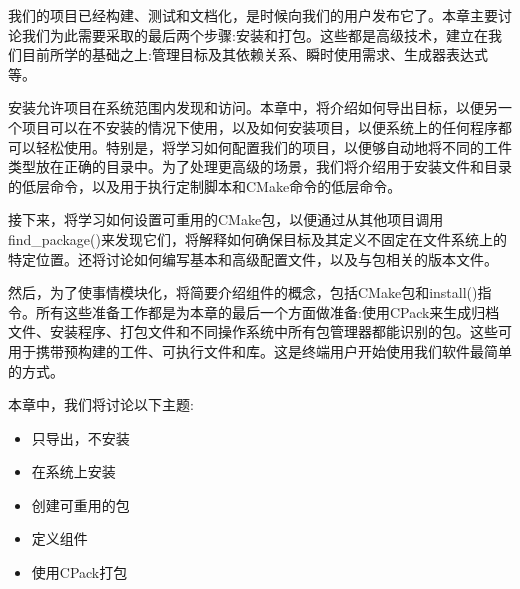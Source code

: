 
我们的项目已经构建、测试和文档化，是时候向我们的用户发布它了。本章主要讨论我们为此需要采取的最后两个步骤:安装和打包。这些都是高级技术，建立在我们目前所学的基础之上:管理目标及其依赖关系、瞬时使用需求、生成器表达式等。

安装允许项目在系统范围内发现和访问。本章中，将介绍如何导出目标，以便另一个项目可以在不安装的情况下使用，以及如何安装项目，以便系统上的任何程序都可以轻松使用。特别是，将学习如何配置我们的项目，以便够自动地将不同的工件类型放在正确的目录中。为了处理更高级的场景，我们将介绍用于安装文件和目录的低层命令，以及用于执行定制脚本和CMake命令的低层命令。

接下来，将学习如何设置可重用的CMake包，以便通过从其他项目调用find\_package()来发现它们，将解释如何确保目标及其定义不固定在文件系统上的特定位置。还将讨论如何编写基本和高级配置文件，以及与包相关的版本文件。

然后，为了使事情模块化，将简要介绍组件的概念，包括CMake包和install()指令。所有这些准备工作都是为本章的最后一个方面做准备:使用CPack来生成归档文件、安装程序、打包文件和不同操作系统中所有包管理器都能识别的包。这些可用于携带预构建的工件、可执行文件和库。这是终端用户开始使用我们软件最简单的方式。

本章中，我们将讨论以下主题:

\begin{itemize}
\item 
只导出，不安装

\item 
在系统上安装

\item 
创建可重用的包

\item 
定义组件

\item 
使用CPack打包
\end{itemize}









